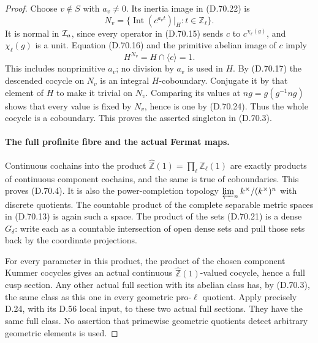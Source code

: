 \begin{proof}
Choose \(v\notin S\) with \(a_v\ne0\).
Its inertia image in (D.70.22) is
\[
 N_v=\{\operatorname{Int}(c^{a_v t})|_H:
                                  t\in\mathbb Z_\ell\}.
                                                        \tag{D.70.23}
\]
It is normal in \({\cal I}_a\), since every
operator in (D.70.15) sends \(c\) to
\(c^{\chi_\ell(g)}\), and \(\chi_\ell(g)\)
is a unit. Equation (D.70.16) and the
primitive abelian image of \(c\) imply
\[
                    H^{N_v}=H\cap\langle c\rangle=1.
                                                        \tag{D.70.24}
\]
This includes nonprimitive \(a_v\); no
division by \(a_v\) is used in \(H\).
By (D.70.17) the descended cocycle on
\(N_v\) is an integral \(H\)-coboundary.
Conjugate it by that element of \(H\) to
make it trivial on \(N_v\). Comparing its
values at \(ng=g(g^{-1}ng)\) shows that
every value is fixed by \(N_v\), hence
is one by (D.70.24). Thus the whole
cocycle is a coboundary. This proves
the asserted singleton in (D.70.3).

\paragraph{The full profinite fibre and the actual Fermat maps.}
Continuous cochains into the product
\(\widehat{\mathbb Z}(1)=\prod_\ell\mathbb Z_\ell(1)\)
are exactly products of continuous
component cochains, and the same is true
of coboundaries. This proves (D.70.4).
It is also the power-completion topology
\(\varprojlim_n k^\times/(k^\times)^n\)
with discrete quotients. The countable
product of the complete separable metric
spaces in (D.70.13) is again such a space.
The product of the sets (D.70.21) is a
dense \(G_\delta\): write each as a
countable intersection of open dense
sets and pull those sets back by the
coordinate projections.

For every parameter in this product,
the product of the chosen component
Kummer cocycles gives an actual continuous
\(\widehat{\mathbb Z}(1)\)-valued cocycle,
hence a full cusp section. Any other
actual full section with its abelian
class has, by (D.70.3), the same class
as this one in every geometric pro-\(\ell\)
quotient. Apply precisely D.24, with its
D.56 local input, to these two actual
full sections. They have the same full
class. No assertion that primewise
geometric quotients detect arbitrary
geometric elements is used.


\end{proof}
